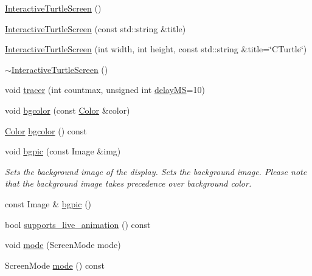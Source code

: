 \begin{DoxyCompactItemize}
\item 
\hyperlink{classcturtle_1_1InteractiveTurtleScreen_a3a2fc53b07958002992b8189a5af62f6}{Interactive\+Turtle\+Screen} ()
\item 
\hyperlink{classcturtle_1_1InteractiveTurtleScreen_ad65865be39cbe33c8614bb14f918058f}{Interactive\+Turtle\+Screen} (const std\+::string \&title)
\item 
\hyperlink{classcturtle_1_1InteractiveTurtleScreen_af9fb0672e3b17b2c07497de0b9ef99ee}{Interactive\+Turtle\+Screen} (int width, int height, const std\+::string \&title=\char`\"{}C\+Turtle\char`\"{})
\item 
\hyperlink{classcturtle_1_1InteractiveTurtleScreen_a74aecb49c64fd0035750c521d6029ccf}{$\sim$\+Interactive\+Turtle\+Screen} ()
\item 
void \hyperlink{classcturtle_1_1InteractiveTurtleScreen_ac6cbbcf714c490abb300cd6a931950f3}{tracer} (int countmax, unsigned int \hyperlink{classcturtle_1_1InteractiveTurtleScreen_a26338beec078bb1c29792cd658c1be71}{delay\+MS}=10)
\item 
void \hyperlink{classcturtle_1_1InteractiveTurtleScreen_acb5441704b45a01830d69df46a23732f}{bgcolor} (const \hyperlink{classcturtle_1_1Color}{Color} \&color)
\item 
\hyperlink{classcturtle_1_1Color}{Color} \hyperlink{classcturtle_1_1InteractiveTurtleScreen_a55289593218ba99904f7957700ef7dae}{bgcolor} () const
\item 
void \hyperlink{classcturtle_1_1InteractiveTurtleScreen_af681fbd6140ea760204fa9a1766725e3}{bgpic} (const Image \&img)
\begin{DoxyCompactList}\small\item\em Sets the background image of the display. Sets the background image. Please note that the background image takes precedence over background color. \end{DoxyCompactList}\item 
const Image \& \hyperlink{classcturtle_1_1InteractiveTurtleScreen_a57a90b8e6163e46c6fcb6f37b0b00e78}{bgpic} ()
\item 
bool \hyperlink{classcturtle_1_1InteractiveTurtleScreen_ad28f7c6e4058541a2c4258b4455fad74}{supports\+\_\+live\+\_\+animation} () const
\item 
void \hyperlink{classcturtle_1_1InteractiveTurtleScreen_a1c666afe65211cf9eedaffa17206a697}{mode} (Screen\+Mode mode)
\item 
Screen\+Mode \hyperlink{classcturtle_1_1InteractiveTurtleScreen_af65c66dbfe93fa748944f7a6d299080e}{mode} () const

\end{DoxyCompactItemize}
